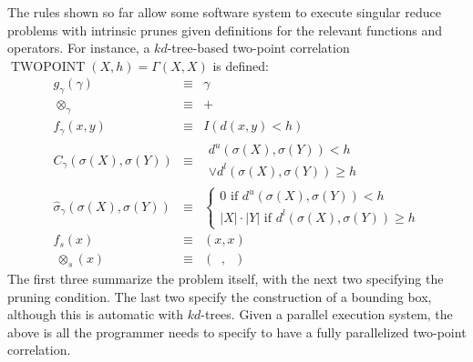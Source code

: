 \documentclass[times, leqno,twocolumn]{article}
\newcommand{\bigvec}[1]{\mathop{\overrightarrow{#1}}}
\newcommand{\summary}{\hat{\sigma}}
\DeclareMathOperator{\TWOPT}{TWOPOINT}
\newcommand{\lo}[1]{#1^{l}}
\newcommand{\up}[1]{#1^{u}}
\newcommand{\distlo}{\lo{d}}
\newcommand{\distup}{\up{d}}
\newcommand{\dist}[2]{d(#1,#2)}
\newcommand{\nameop}[2]{{\scriptstyle\:}#1_{\!#2}}
\newcommand{\myop}[1]{\nameop{\otimes}{#1}}
\newcommand{\letterglob}{\gamma}
\newcommand{\outglob}{\Gamma}
\newcommand{\inglob}{\gamma}
\newcommand{\opglob}{\myop{\letterglob}}
\newcommand{\fglob}{f_{\!\letterglob}}
\newcommand{\gglob}{g_{\!\letterglob}}
\newcommand{\canpruneglob}{C_{\!\letterglob}}
\newcommand{\deltaglob}{\summary_{\!\letterglob}}
\newcommand{\letterstat}{s}
\newcommand{\outstat}{\sigma}
\newcommand{\opstat}{\myop{\letterstat}}
\newcommand{\fstat}{f_{\!\letterstat}}
\begin{document}
The rules shown so far allow some software system to execute singular reduce problems with intrinsic prunes given definitions for the relevant functions and operators.
For instance, a $kd$-tree-based two-point correlation $\TWOPT(X, h)= \outglob(X,X)$ is defined:
\begin{eqnarray*}
\label{eqn:tpc_gglob}
\gglob(\inglob) &\equiv& \inglob
\\
\label{eqn:tpc_opglob}
\opglob &\equiv& +
\\
\label{eqn:tpc_fglob}
\fglob(x,y) &\equiv& I(\dist{x}{y} < h)
\\
\label{eqn:tpc_canpruneglob}
\canpruneglob(\sigma(X), \sigma(Y))
&\equiv&
\begin{array}{l}\distup(\outstat(X),\outstat(Y)) < h \\ \vee \distlo(\outstat(X),\outstat(Y)) \geq h\end{array}
\\
\label{eqn:tpc_deltaglob}
\deltaglob(\outstat(X),\outstat(Y)) &\equiv& \left\{ \begin{array}{l} 0 \text{ if } \distup(\outstat(X),\outstat(Y)) < h \\ |X|\cdot|Y| \text{ if } \distlo(\outstat(X),\outstat(Y)) \geq h \end{array}\right.
\\
\label{eqn:tpc_fstat}
\fstat(x) &\equiv& (x,x)
\\
\label{eqn:tpc_opstat}
\opstat(x) &\equiv& \left( \bigvec{\min} , \bigvec{\max} \right)
\end{eqnarray*}
\noindent The first three summarize the problem itself, with the next two specifying the pruning condition.
The last two specify the construction of a bounding box, although this is automatic with $kd$-trees.
Given a parallel execution system, the above is all the programmer needs to specify to have a fully parallelized two-point correlation.


\end{document}
